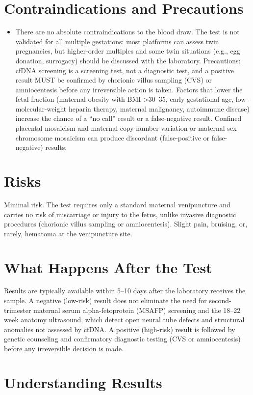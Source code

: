 \section*{Contraindications and Precautions}
\begin{itemize}
  \item There are no absolute contraindications to the blood draw. The test is not validated for all multiple gestations: most platforms can assess twin pregnancies, but higher-order multiples and some twin situations (e.g., egg donation, surrogacy) should be discussed with the laboratory. Precautions: cfDNA screening is a screening test, not a diagnostic test, and a positive result MUST be confirmed by chorionic villus sampling (CVS) or amniocentesis before any irreversible action is taken. Factors that lower the fetal fraction (maternal obesity with BMI >30--35, early gestational age, low-molecular-weight heparin therapy, maternal malignancy, autoimmune disease) increase the chance of a ``no call'' result or a false-negative result. Confined placental mosaicism and maternal copy-number variation or maternal sex chromosome mosaicism can produce discordant (false-positive or false-negative) results.
\end{itemize}
\section*{Risks}
Minimal risk. The test requires only a standard maternal venipuncture and carries no risk of miscarriage or injury to the fetus, unlike invasive diagnostic procedures (chorionic villus sampling or amniocentesis). Slight pain, bruising, or, rarely, hematoma at the venipuncture site.

\section*{What Happens After the Test}
Results are typically available within 5--10 days after the laboratory receives the sample. A negative (low-risk) result does not eliminate the need for second-trimester maternal serum alpha-fetoprotein (MSAFP) screening and the 18--22 week anatomy ultrasound, which detect open neural tube defects and structural anomalies not assessed by cfDNA. A positive (high-risk) result is followed by genetic counseling and confirmatory diagnostic testing (CVS or amniocentesis) before any irreversible decision is made.

\section*{Understanding Results}


